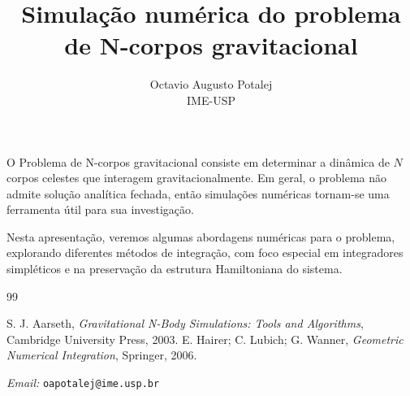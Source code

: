 \documentclass[12pt,a4paper]{amsart}
\begin{document}
\title{Simulação numérica do problema de N-corpos gravitacional}
\author{
    Octavio Augusto Potalej
    \vspace{0.25cm} \\ 
    IME-USP
}

\maketitle

\vspace{1cm}
\justifying

\begin{center}
    \begin{minipage}{10cm}
    \Large{
    
    O Problema de N-corpos gravitacional consiste em determinar a dinâmica de $N$ corpos celestes que interagem gravitacionalmente. Em geral, o problema não admite solução analítica fechada, então simulações numéricas tornam-se uma ferramenta útil para sua investigação.
    
    Nesta apresentação, veremos algumas abordagens numéricas para o problema, explorando diferentes métodos de integração, com foco especial em integradores simpléticos e na preservação da estrutura Hamiltoniana do sistema.

    
    }
    \end{minipage}
 \end{center}
	
\vspace{1.5cm}

 \begin{thebibliography}{99}

     S. J. Aarseth, {\em Gravitational N-Body Simulations: Tools and Algorithms}, Cambridge University Press, 2003.
     E. Hairer; C. Lubich; G. Wanner, {\em Geometric Numerical Integration}, Springer, 2006.
        
\end{thebibliography}

\bigskip

\begin{flushleft}
    \emph{Email:}  \texttt{oapotalej@ime.usp.br}
\end{flushleft}	
	
\end{document}
